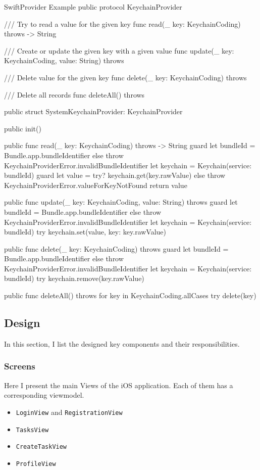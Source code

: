 \documentclass[
  biblatex,
  language=english,
  figures=false,
  sourcecodes,
  glossaries,
  index
]{kidiplom}
\begin{document}
\begin{kicode}{Swift}{}{Provider Example}
public protocol KeychainProvider {
    
    /// Try to read a value for the given key
    func read(_ key: KeychainCoding) throws -> String

    /// Create or update the given key with a given value
    func update(_ key: KeychainCoding, value: String) throws

    /// Delete value for the given key
    func delete(_ key: KeychainCoding) throws

    /// Delete all records
    func deleteAll() throws
}

public struct SystemKeychainProvider: KeychainProvider {
    public init() {}
    
    public func read(_ key: KeychainCoding) throws -> String {
        guard let bundleId = Bundle.app.bundleIdentifier else { throw KeychainProviderError.invalidBundleIdentifier }
        let keychain = Keychain(service: bundleId)
        guard let value = try? keychain.get(key.rawValue) else { throw KeychainProviderError.valueForKeyNotFound }
        return value
    }
    
    public func update(_ key: KeychainCoding, value: String) throws {
        guard let bundleId = Bundle.app.bundleIdentifier else { throw KeychainProviderError.invalidBundleIdentifier }
        let keychain = Keychain(service: bundleId)
        try keychain.set(value, key: key.rawValue)
    }
    
    public func delete(_ key: KeychainCoding) throws {
        guard let bundleId = Bundle.app.bundleIdentifier else { throw KeychainProviderError.invalidBundleIdentifier }
        let keychain = Keychain(service: bundleId)
        try keychain.remove(key.rawValue)
    }
    
    public func deleteAll() throws {
        for key in KeychainCoding.allCases {
            try delete(key)
        }
    }
}
\end{kicode}

\subsection{Design}
In this section, I list the designed key components and their responsibilities.

\subsubsection{Screens}
Here I present the main Views of the iOS application. Each of them has a corresponding viewmodel.
\begin{itemize}
	\item \texttt{LoginView} and \texttt{RegistrationView}
	\item \texttt{TasksView}
	\item \texttt{CreateTaskView}
	\item \texttt{ProfileView}
\end{itemize}
\end{document}
